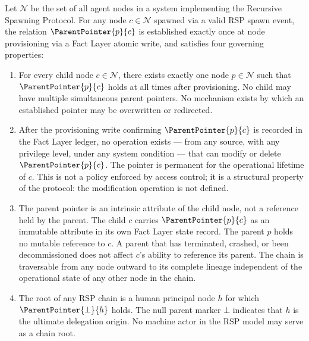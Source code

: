 \begin{definition}
\label{def:parent-pointer}
Let $\mathcal{N}$ be the set of all agent nodes in a \bxthree{} system implementing the Recursive Spawning Protocol. For any node $c \in \mathcal{N}$ spawned via a valid RSP spawn event, the relation $\ParentPointer{p}{c}$ is established exactly once at node provisioning via a Fact Layer atomic write, and satisfies four governing properties:

\begin{enumerate}
    \item[(P1) \textbf{Uniqueness}] For every child node $c \in \mathcal{N}$, there exists exactly one node $p \in \mathcal{N}$ such that $\ParentPointer{p}{c}$ holds at all times after provisioning. No child may have multiple simultaneous parent pointers. No mechanism exists by which an established pointer may be overwritten or redirected.

    \item[(P2) \textbf{Immutability}] After the provisioning write confirming $\ParentPointer{p}{c}$ is recorded in the Fact Layer ledger, no operation exists --- from any source, with any privilege level, under any system condition --- that can modify or delete $\ParentPointer{p}{c}$. The pointer is permanent for the operational lifetime of $c$. This is not a policy enforced by access control; it is a structural property of the protocol: the modification operation is not defined.

    \item[(P3) \textbf{Directionality}] The parent pointer is an intrinsic attribute of the child node, not a reference held by the parent. The child $c$ carries $\ParentPointer{p}{c}$ as an immutable attribute in its own Fact Layer state record. The parent $p$ holds no mutable reference to $c$. A parent that has terminated, crashed, or been decommissioned does not affect $c$'s ability to reference its parent. The chain is traversable from any node outward to its complete lineage independent of the operational state of any other node in the chain.

    \item[(P4) \textbf{Human Anchor Termination}] The root of any RSP chain is a human principal node $h$ for which $\ParentPointer{\bot}{h}$ holds. The null parent marker $\bot$ indicates that $h$ is the ultimate delegation origin. No machine actor in the RSP model may serve as a chain root.
\end{enumerate}
\end{definition}


